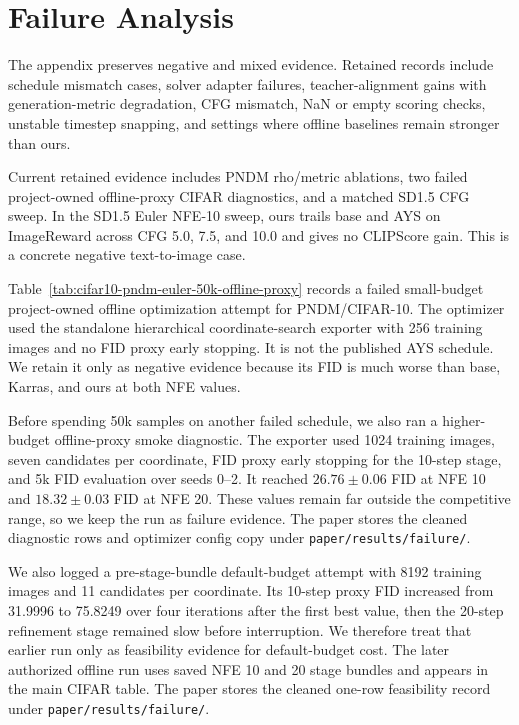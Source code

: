 \section{Failure Analysis}
\label{app:failure-analysis}

The appendix preserves negative and mixed evidence. Retained records include
schedule mismatch cases, solver adapter failures, teacher-alignment gains with
generation-metric degradation, CFG mismatch, NaN or empty scoring checks,
unstable timestep snapping, and settings where offline baselines remain
stronger than ours.

Current retained evidence includes PNDM rho/metric ablations, two failed
project-owned offline-proxy CIFAR diagnostics, and a matched SD1.5 CFG sweep. In
the SD1.5 Euler NFE-10 sweep, ours trails base and AYS on ImageReward
across CFG 5.0, 7.5, and 10.0 and gives no CLIPScore gain. This is a concrete
negative text-to-image case.





Table~\ref{tab:cifar10-pndm-euler-50k-offline-proxy} records a failed
small-budget project-owned offline optimization attempt for PNDM/CIFAR-10. The
optimizer used the standalone hierarchical coordinate-search exporter with 256
training images and no FID proxy early stopping. It is not the published AYS
schedule. We retain it only as negative evidence because its FID is much worse
than base, Karras, and ours at both NFE values.

Before spending 50k samples on another failed schedule, we also ran a
higher-budget offline-proxy smoke diagnostic. The exporter used 1024 training
images, seven candidates per coordinate, FID proxy early stopping for the
10-step stage, and 5k FID evaluation over seeds 0--2. It reached
$26.76 \pm 0.06$ FID at NFE 10 and $18.32 \pm 0.03$ FID at NFE 20. These
values remain far outside the competitive range, so we keep the run as failure
evidence. The paper stores the cleaned diagnostic rows and optimizer config copy
under \texttt{paper/results/failure/}.

We also logged a pre-stage-bundle default-budget attempt with 8192 training
images and 11 candidates per coordinate. Its 10-step proxy FID increased from
31.9996 to 75.8249 over four iterations after the first best value, then the
20-step refinement stage remained slow before interruption. We therefore treat
that earlier run only as feasibility evidence for default-budget cost. The
later authorized offline run uses saved NFE 10 and 20 stage bundles and appears
in the main CIFAR table. The paper stores the cleaned one-row feasibility
record under \texttt{paper/results/failure/}.

